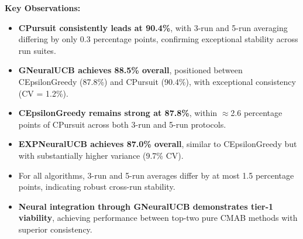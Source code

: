 \documentclass[12pt,a4paper]{article}
\newcommand{\performance}[1]{\textcolor{performancecolor}{\textbf{#1}}}
\newcommand{\legacy}[1]{\textcolor{legacycolor}{\textbf{#1}}}
\newcommand{\neural}[1]{\textcolor{neuralcolor}{\textbf{#1}}}
\begin{document}
\begin{tcolorbox}[colback=performancecolor!10,colframe=performancecolor,title=\textbf{Primary Performance Results (Aggregated Across Capacities, Environments, and Regimes)}]
\textbf{Key Observations:}
\begin{itemize}
\item \performance{CPursuit consistently leads at 90.4\%}, with 3-run and 5-run averaging differing by only 0.3 percentage points, confirming exceptional stability across run suites.
\item \neural{GNeuralUCB achieves 88.5\% overall}, positioned between CEpsilonGreedy (87.8\%) and CPursuit (90.4\%), with exceptional consistency (CV = 1.2\%).
\item \performance{CEpsilonGreedy remains strong at 87.8\%}, within $\approx$2.6 percentage points of CPursuit across both 3-run and 5-run protocols.
\item \legacy{EXPNeuralUCB achieves 87.0\% overall}, similar to CEpsilonGreedy but with substantially higher variance (9.7\% CV).
\item For all algorithms, 3-run and 5-run averages differ by at most 1.5 percentage points, indicating robust cross-run stability.
\item \neural{Neural integration through GNeuralUCB demonstrates tier-1 viability}, achieving performance between top-two pure CMAB methods with superior consistency.
\end{itemize}

\end{tcolorbox}
\end{document}
